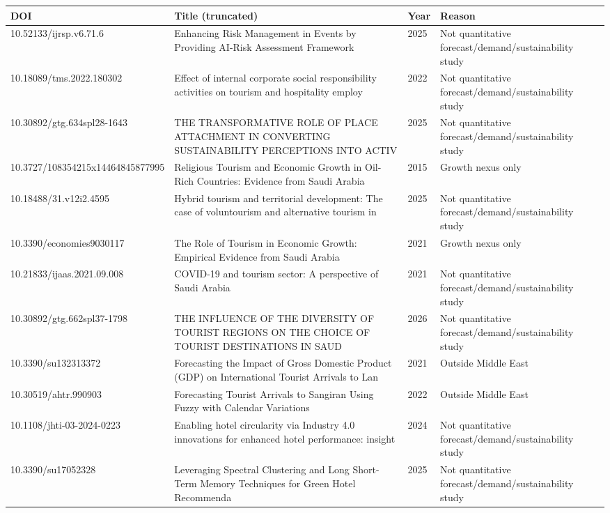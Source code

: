 \begin{longtable}{@{}p{3.6cm}p{7.3cm}p{0.8cm}p{3.4cm}@{}}
\toprule
DOI & Title (truncated) & Year & Reason\\
\midrule\endhead
10.52133/ijrsp.v6.71.6 & Enhancing Risk Management in Events by Providing AI-Risk Assessment Framework & 2025 & Not quantitative forecast/demand/sustainability study \\
10.18089/tms.2022.180302 & Effect of internal corporate social responsibility activities on tourism and hospitality employ & 2022 & Not quantitative forecast/demand/sustainability study \\
10.30892/gtg.634spl28-1643 & THE TRANSFORMATIVE ROLE OF PLACE ATTACHMENT IN CONVERTING SUSTAINABILITY PERCEPTIONS INTO ACTIV & 2025 & Not quantitative forecast/demand/sustainability study \\
10.3727/108354215x14464845877995 & Religious Tourism and Economic Growth in Oil-Rich Countries: Evidence from Saudi Arabia & 2015 & Growth nexus only \\
10.18488/31.v12i2.4595 & Hybrid tourism and territorial development: The case of voluntourism and alternative tourism in & 2025 & Not quantitative forecast/demand/sustainability study \\
10.3390/economies9030117 & The Role of Tourism in Economic Growth: Empirical Evidence from Saudi Arabia & 2021 & Growth nexus only \\
10.21833/ijaas.2021.09.008 & COVID-19 and tourism sector: A perspective of Saudi Arabia & 2021 & Not quantitative forecast/demand/sustainability study \\
10.30892/gtg.662spl37-1798 & THE INFLUENCE OF THE DIVERSITY OF TOURIST REGIONS ON THE CHOICE OF TOURIST DESTINATIONS IN SAUD & 2026 & Not quantitative forecast/demand/sustainability study \\
10.3390/su132313372 & Forecasting the Impact of Gross Domestic Product (GDP) on International Tourist Arrivals to Lan & 2021 & Outside Middle East \\
10.30519/ahtr.990903 & Forecasting Tourist Arrivals to Sangiran Using Fuzzy with Calendar Variations & 2022 & Outside Middle East \\
10.1108/jhti-03-2024-0223 & Enabling hotel circularity via Industry 4.0 innovations for enhanced hotel performance: insight & 2024 & Not quantitative forecast/demand/sustainability study \\
10.3390/su17052328 & Leveraging Spectral Clustering and Long Short-Term Memory Techniques for Green Hotel Recommenda & 2025 & Not quantitative forecast/demand/sustainability study \\

\end{longtable}
